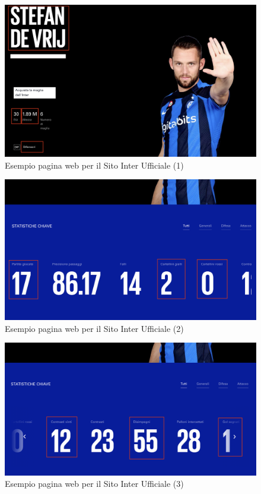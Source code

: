 \begin{figure}
    \centering
    \includegraphics[scale=0.22]{img/inter1.png}
    \caption{Esempio pagina web per il Sito Inter Ufficiale (1)}
    \label{fig:inter1}
\end{figure}
\begin{figure}
    \centering
    \includegraphics[scale=0.22]{img/inter2.png}
    \caption{Esempio pagina web per il Sito Inter Ufficiale (2)}
    \label{fig:inter1}
\end{figure}
\begin{figure}
    \centering
    \includegraphics[scale=0.22]{img/inter3.png}
    \caption{Esempio pagina web per il Sito Inter Ufficiale (3)}
    \label{fig:inter1}
\end{figure}

